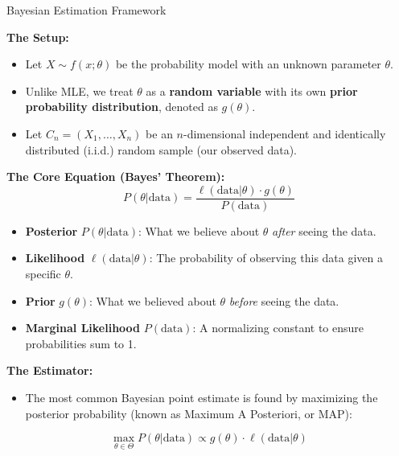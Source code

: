 \begin{defbox}{Bayesian Estimation Framework}

\textbf{The Setup:}
\begin{itemize}
    \item Let $X \sim f(x; \theta)$ be the probability model with an unknown parameter $\theta$.
    \item Unlike MLE, we treat $\theta$ as a \textbf{random variable} with its own \textbf{prior probability distribution}, denoted as $g(\theta)$.
    \item Let $C_n = (X_1, \ldots, X_n)$ be an $n$-dimensional independent and identically distributed (i.i.d.) random sample (our observed data).
\end{itemize}

\vspace{0.2cm}
\textbf{The Core Equation (Bayes' Theorem):}
$$P(\theta | \text{data}) = \frac{\ell(\text{data} | \theta) \cdot g(\theta)}{P(\text{data})}$$

\begin{itemize}
    \item \textbf{Posterior} $P(\theta | \text{data})$: What we believe about $\theta$ \textit{after} seeing the data.
    \item \textbf{Likelihood} $\ell(\text{data} | \theta)$: The probability of observing this data given a specific $\theta$.
    \item \textbf{Prior} $g(\theta)$: What we believed about $\theta$ \textit{before} seeing the data.
    \item \textbf{Marginal Likelihood} $P(\text{data})$: A normalizing constant to ensure probabilities sum to 1.
\end{itemize}

\vspace{0.2cm}
\textbf{The Estimator:}
\begin{itemize}
    \item The most common Bayesian point estimate is found by maximizing the posterior probability (known as Maximum A Posteriori, or MAP):
\end{itemize}
$$\max_{\theta \in \Theta} P(\theta | \text{data}) \propto g(\theta) \cdot \ell(\text{data} | \theta)$$

\end{defbox}

